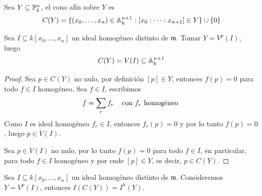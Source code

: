 \documentclass[11pt]{article}
\def \m {\mathfrak{m}}
\begin{document}
\newpage

\begin{dfn}
    Sea $Y\subseteq\P_{k}^{n}$, el cono afín sobre $Y$ es
    \begin{equation*}
        C(Y)=\{(x_{0},\dots,x_{n})\in\A_{k}^{n+1}:[x_{0}:\dots:x_{n+1}]\in Y\}\cup\{0\}
    \end{equation*}
\end{dfn}

\begin{lema}
    Sea $I\subseteq k[x_{0},\dots,x_{n}]$ un ideal homogéneo distinto de $\m$. Tomar $Y=V^{p}(I)$, 
    luego
    \begin{equation*}
        C(Y)=V(I)\subseteq\A_{k}^{n+1}
    \end{equation*}
\end{lema}

\begin{proof}
    Sea $p\in C(Y)$ no nulo, por definición $[p]\in Y$, entonces $f(p)=0$ para todo 
    $f\in I$ homogéneo. Sea $f\in I$, escribimos
    \begin{equation*}
        f=\sum_{r}f_{r} \htext{con $f_{r}$ homogéneo}
    \end{equation*}
    Como $I$ es ideal homogéneo $f_{r}\in I$, entonces $f_{r}(p)=0$ y por lo tanto $f(p)=0$, luego
    $p\in V(I)$.

    \vspace{1mm}
    Sea $p\in V(I)$ no nulo, por lo tanto $f(p)=0$ para todo $f\in I$, en particular, para todo 
    $f\in I$ homogéneo y por ende $[p]\in Y$, es decir, $p\in C(Y)$.
\end{proof}

\begin{lema}
    Sea $I\subseteq k[x_{0},\dots,x_{n}]$ un ideal homogéneo distinto de $\m$. Consideremos 
    $Y=V^{p}(I)$, entonces $I(C(Y))=I^{h}(Y)$.
\end{lema}
\end{document}
